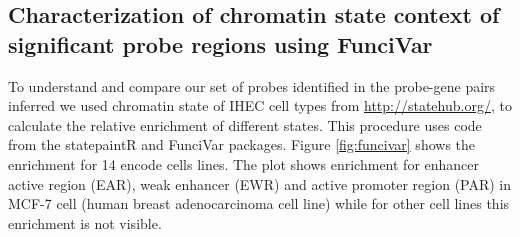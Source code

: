 \clearpage

\subsection*{Characterization of chromatin state context of significant probe regions using FunciVar}

To understand and compare our set of probes identified in the probe-gene pairs inferred
we used chromatin state of IHEC cell types
from \url{http://statehub.org/}, to calculate the relative enrichment of
different states.
This procedure uses code from the statepaintR \cite{statepaintr} and FunciVar \cite{funcivar} packages.
Figure \ref{fig:funcivar} shows the enrichment for 14 encode cells lines.
The plot shows enrichment for enhancer active region (EAR), weak enhancer (EWR)
and active promoter region (PAR) in MCF-7 cell (human breast adenocarcinoma cell line)
while for other cell lines this enrichment is not visible.



%
%

